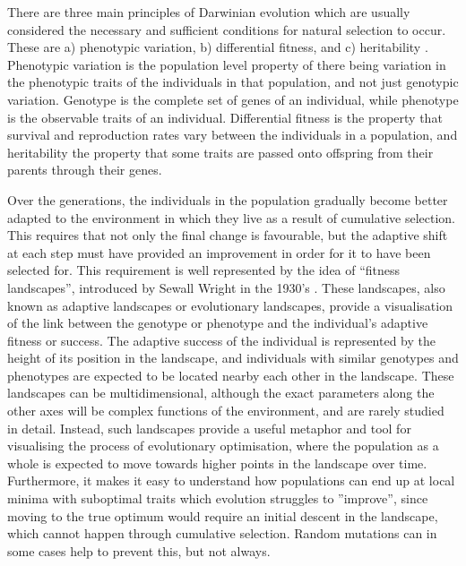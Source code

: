 \documentclass[multicolumn, 9pt]{extarticle}
\begin{document}
There are three main principles of Darwinian evolution which are usually considered the necessary and sufficient conditions for natural selection to occur. These are a) phenotypic variation, b) differential fitness, and c) heritability \cite{Eyal}. Phenotypic variation is the population level property of there being variation in the phenotypic traits of the individuals in that population, and not just genotypic variation. Genotype is the complete set of genes of an individual, while phenotype is the observable traits of an individual. Differential fitness is the property that survival and reproduction rates vary between the individuals in a population, and heritability the property that some traits are passed onto offspring from their parents through their genes. 

Over the generations, the individuals in the population gradually become better adapted to the environment in which they live as a result of cumulative selection. This requires that not only the final change is favourable, but the adaptive shift at each step must have provided an improvement in order for it to have been selected for.  This requirement is well represented by the idea of ``fitness landscapes'', introduced by Sewall Wright in the 1930's \cite{Sewall}. These landscapes, also known as adaptive landscapes or evolutionary landscapes, provide a visualisation of the link between the genotype or phenotype and the individual's adaptive fitness or success. The adaptive success of the individual is represented by the height of its position in the landscape, and individuals with similar genotypes and phenotypes are expected to be located nearby each other in the landscape. These landscapes can be multidimensional, although the exact parameters along the other axes will be complex functions of the environment, and are rarely studied in detail. Instead, such landscapes provide a useful metaphor and tool for visualising the process of evolutionary optimisation, where the population as a whole is expected to move towards higher points in the landscape over time. Furthermore, it makes it easy to understand how populations can end up at local minima with suboptimal traits which evolution struggles to ''improve'', since moving to the true optimum would require an initial descent in the landscape, which cannot happen through cumulative selection. Random mutations can in some cases help to prevent this, but not always.
\end{document}
